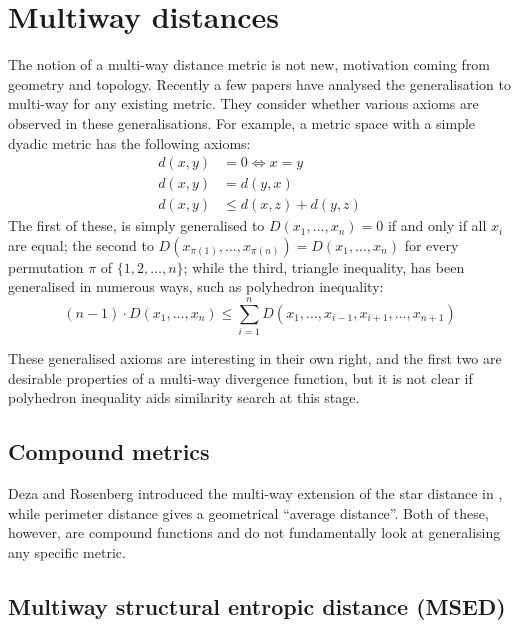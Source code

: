 \section{Multiway distances}
The notion of a multi-way distance metric is not new,  motivation coming from geometry and topology.  Recently a few papers have  analysed the generalisation to multi-way for any existing metric\cite{Warrens2009, Warrens2010, Deza2000797}.  They consider whether various axioms are observed in these generalisations. For example, a metric space with a simple dyadic metric has the following axioms:
%
\begin{equation*}
\begin{aligned}
    d(x, y) &= 0 \Leftrightarrow x = y \\
    d(x, y) &= d(y, x) \\
    d(x, y) &\leq d(x, z) + d(y, z)
\end{aligned}
\end{equation*}
%
The first of these, is simply generalised to $D(x_1, \ldots, x_n) = 0$ if and only if all $x_i$ are equal; the second to $D(x_{\pi(1)}, \ldots, x_{\pi(n)}) = D(x_1, \ldots, x_n)$ for every permutation $\pi$ of $\{1, 2, \ldots, n\}$; while the third, triangle inequality, has been generalised in numerous ways\cite{Warrens2010}, such as polyhedron inequality:
%
\begin{equation*}
    (n - 1) \cdot D(x_1, \ldots, x_n) \leq \sum_{i = 1}^n D(x_1, \ldots, x_{i-1}, x_{i + 1},\ldots, x_{n+1})
\end{equation*}
%

These generalised axioms are interesting in their own right, and the first two  are desirable properties of a multi-way divergence function, but it is not clear if polyhedron inequality aids similarity search at this stage.
\subsection{Compound metrics} 
Deza and Rosenberg introduced the multi-way extension of the star distance in \cite{Deza2000797}, while perimeter distance\cite{Warrens2010} gives a geometrical ``average distance''.  Both of these, however, are compound functions and do not fundamentally look at generalising any specific metric.


\subsection{Multiway structural entropic distance (MSED)}

